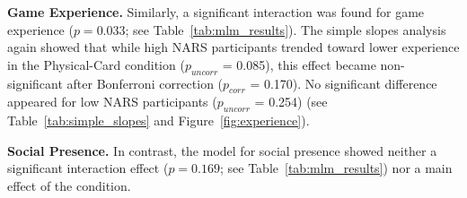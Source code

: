 \documentclass[sigconf,screen]{acmart-tagged}
\newcommand{\rev}[1]{#1}
\begin{document}
\noindent \rev{\textbf{Game Experience.} Similarly, a significant interaction was found for game experience ($p = 0.033$; see Table~\ref{tab:mlm_results}). The simple slopes analysis again showed that while high NARS participants trended toward lower experience in the Physical-Card condition ($p_{uncorr}$ = 0.085), this effect became non-significant after Bonferroni correction ($p_{corr}$ = 0.170). No significant difference appeared for low NARS participants ($p_{uncorr}$ = 0.254) (see Table~\ref{tab:simple_slopes} and Figure~\ref{fig:experience}).}

\noindent \textbf{Social Presence.} In contrast, the model for social presence showed neither a significant interaction effect ($p = 0.169$; see Table~\ref{tab:mlm_results}) nor a main effect of the condition.

\vspace{-8pt}

\begin{table}[htbp]
\centering
\caption{\rev{Multilevel Models Predicting Narrative Immersion, Game Experience, and Social Presence as a Function of Condition, NARS, and Their Interaction. Random Intercepts were Specified for Game Sessions.}}
\label{tab:mlm_results}
\end{table}
\end{document}

